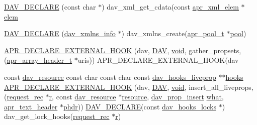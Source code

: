 \begin{DoxyCompactItemize}
\item 
\hyperlink{group__MOD__DAV_gafbee4454bf3a2993e9950ecdf3c15ad1}{D\+A\+V\+\_\+\+D\+E\+C\+L\+A\+RE} (const char $\ast$) dav\+\_\+xml\+\_\+get\+\_\+cdata(const \hyperlink{structapr__xml__elem}{apr\+\_\+xml\+\_\+elem} $\ast$\hyperlink{structelem}{elem}
\item 
\hyperlink{group__MOD__DAV_ga6a529d0d3d774f021627664aed68a07d}{D\+A\+V\+\_\+\+D\+E\+C\+L\+A\+RE} (\hyperlink{structdav__xmlns__info}{dav\+\_\+xmlns\+\_\+info} $\ast$) dav\+\_\+xmlns\+\_\+create(\hyperlink{structapr__pool__t}{apr\+\_\+pool\+\_\+t} $\ast$\hyperlink{group__APR__XLATE_gabb3cd978f04c73d0b763c391e9bfde73}{pool})
\item 
\hyperlink{group__MOD__DAV_ga1d9b163c7a5de5a5bb3c948719471132}{A\+P\+R\+\_\+\+D\+E\+C\+L\+A\+R\+E\+\_\+\+E\+X\+T\+E\+R\+N\+A\+L\+\_\+\+H\+O\+OK} (dav, \hyperlink{group__MOD__DAV_gab3d9c9436d79e6e827e3d828f67f6053}{D\+AV}, \hyperlink{group__MOD__ISAPI_gacd6cdbf73df3d9eed42fa493d9b621a6}{void}, gather\+\_\+propsets,(\hyperlink{structapr__array__header__t}{apr\+\_\+array\+\_\+header\+\_\+t} $\ast$uris)) A\+P\+R\+\_\+\+D\+E\+C\+L\+A\+R\+E\+\_\+\+E\+X\+T\+E\+R\+N\+A\+L\+\_\+\+H\+O\+OK(dav
\item 
const \hyperlink{structdav__resource}{dav\+\_\+resource} const char const char const \hyperlink{structdav__hooks__liveprop}{dav\+\_\+hooks\+\_\+liveprop} $\ast$$\ast$\hyperlink{group__MOD__DAV_ga2f89c7cfd67d24769756d6d2df79bf5c}{hooks} \hyperlink{group__MOD__DAV_ga067d7abcfe48387bfa3260c37f860d03}{A\+P\+R\+\_\+\+D\+E\+C\+L\+A\+R\+E\+\_\+\+E\+X\+T\+E\+R\+N\+A\+L\+\_\+\+H\+O\+OK} (dav, \hyperlink{group__MOD__DAV_gab3d9c9436d79e6e827e3d828f67f6053}{D\+AV}, \hyperlink{group__MOD__ISAPI_gacd6cdbf73df3d9eed42fa493d9b621a6}{void}, insert\+\_\+all\+\_\+liveprops,(\hyperlink{structrequest__rec}{request\+\_\+rec} $\ast$\hyperlink{pcregrep_8txt_a2e9e9438b26c0bb4425367a7e4f75eb3}{r}, const \hyperlink{structdav__resource}{dav\+\_\+resource} $\ast$\hyperlink{group__APR__Util__RL_gaa6244aacafcc4ec1d0727bdb32614b11}{resource}, \hyperlink{group__MOD__DAV_ga4c0cd73bce52d0eda981ce54973f27af}{dav\+\_\+prop\+\_\+insert} \hyperlink{group__apr__thread__proc_gaf132f350c1657f61f533df7066e903c4}{what}, \hyperlink{structapr__text__header}{apr\+\_\+text\+\_\+header} $\ast$\hyperlink{group__MOD__DAV_ga08f35dafe4ef680fc79b6e69d71c8f90}{phdr})) \hyperlink{util__lock_8c_afe2f14122c74bb061f2f1f6545627af0}{D\+A\+V\+\_\+\+D\+E\+C\+L\+A\+RE}(const \hyperlink{structdav__hooks__locks}{dav\+\_\+hooks\+\_\+locks} $\ast$) dav\+\_\+get\+\_\+lock\+\_\+hooks(\hyperlink{structrequest__rec}{request\+\_\+rec} $\ast$\hyperlink{pcregrep_8txt_a2e9e9438b26c0bb4425367a7e4f75eb3}{r})
$$
\end{DoxyCompactItemize}
